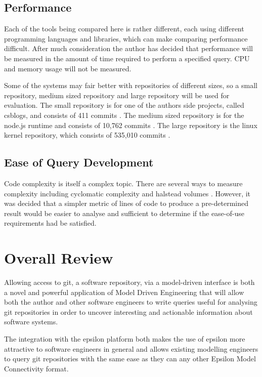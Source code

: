 \documentclass[11pt]{book}
\begin{document}
\subsection{Performance}
Each of the tools being compared here is rather different, each using different programming languages and libraries, which can make comparing performance difficult. After much consideration the author has decided that performance will be measured in the amount of time required to perform a specified query. CPU and memory usage will not be measured.

Some of the systems may fair better with repositories of different sizes, so a small repository, medium sized repository and large repository will be used for evaluation. The small repository is for one of the authors side projects, called csblogs, and consists of 411 commits \cite{csbrepository}. The medium sized repository is for the node.js runtime and consists of 10,762 commits \cite{noderepository}. The large repository is the linux kernel repository, which consists of 535,010 commits \cite{linuxrepository}.

 


\subsection{Ease of Query Development}
Code complexity is itself a complex topic. There are several ways to measure complexity including cyclomatic complexity and halstead volumes \cite{halstead}. However, it was decided that a simpler metric of lines of code to produce a pre-determined result would be easier to analyse and sufficient to determine if the ease-of-use requirements had be satisfied.


\section{Overall Review}
Allowing access to git, a software repository, via a model-driven interface is both a novel and powerful application of Model Driven Engineering that will allow both the author and other software engineers to write queries useful for analysing git repositories in order to uncover interesting and actionable information about software systems.

The integration with the epsilon platform both makes the use of epsilon more attractive to software engineers in general and allows existing modelling engineers to query git repositories with the same ease as they can any other Epsilon Model Connectivity format.
\end{document}
